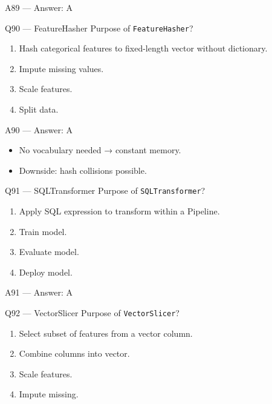 \documentclass[aspectratio=169,10pt]{beamer}
\begin{document}
	\begin{frame}{A89 — Answer: A}
	\end{frame}
	
	\begin{frame}{Q90 — FeatureHasher}
		Purpose of \texttt{FeatureHasher}?
		\begin{enumerate}[label=\Alph*.]
			\item Hash categorical features to fixed-length vector without dictionary.
			\item Impute missing values.
			\item Scale features.
			\item Split data.
		\end{enumerate}
	\end{frame}
	
	\begin{frame}{A90 — Answer: A}
		\begin{itemize}
			\item No vocabulary needed → constant memory.
			\item Downside: hash collisions possible.
		\end{itemize}
	\end{frame}
	
	\begin{frame}{Q91 — SQLTransformer}
		Purpose of \texttt{SQLTransformer}?
		\begin{enumerate}[label=\Alph*.]
			\item Apply SQL expression to transform within a Pipeline.
			\item Train model.
			\item Evaluate model.
			\item Deploy model.
		\end{enumerate}
	\end{frame}
	
	\begin{frame}{A91 — Answer: A}
	\end{frame}
	
	\begin{frame}{Q92 — VectorSlicer}
		Purpose of \texttt{VectorSlicer}?
		\begin{enumerate}[label=\Alph*.]
			\item Select subset of features from a vector column.
			\item Combine columns into vector.
			\item Scale features.
			\item Impute missing.
		\end{enumerate}
	\end{frame}
	
\end{document}
